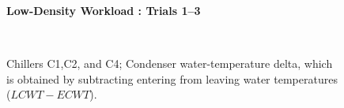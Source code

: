 \documentclass{report}
\begin{document}
\begin{figure}[!h]
\centerline{\bfseries\large Low-Density Workload : Trials 1--3}\\
\caption{Chillers C1,C2, and C4; Condenser water-temperature delta, which is obtained by subtracting entering from leaving water temperatures ($LCWT-ECWT$).}
\end{figure}
\end{document}
